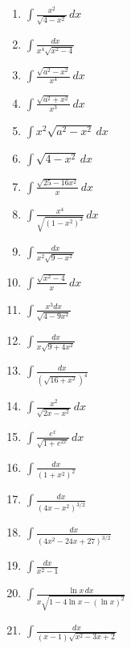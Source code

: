 \documentclass{article}
\begin{document}
\begin{multicols}{2}
\begin{enumerate}
    \item $\displaystyle \int \frac{x^2}{\sqrt{4 - x^2}} \, dx$
    \item $\displaystyle \int \frac{dx}{x^4 \sqrt{x^2 - 4}}$
    \item $\displaystyle \int \frac{\sqrt{a^2 - x^2}}{x^4} \, dx$
    \item $\displaystyle \int \frac{\sqrt{a^2 + x^2}}{x^3} \, dx$
    \item $\displaystyle \int x^2 \sqrt{a^2 - x^2} \, dx$
    \item $\displaystyle \int \sqrt{4 - x^2} \, dx$
    \item $\displaystyle \int \frac{\sqrt{25 - 16x^2}}{x} \, dx$
    \item $\displaystyle \int \frac{x^4}{\sqrt{(1 - x^2)^3}} \, dx$
    \item $\displaystyle \int \frac{dx}{x^2 \sqrt{9 - x^2}}$
    \item $\displaystyle \int \frac{\sqrt{x^2 - 4}}{x} \, dx$
    \item $\displaystyle \int \frac{x^3 dx}{\sqrt{4 - 9x^2}}$
    \item $\displaystyle \int \frac{dx}{x \sqrt{9 + 4x^2}}$
    \item $\displaystyle \int \frac{dx}{(\sqrt{16 + x^2})^4}$
    \item $\displaystyle \int \frac{x^2}{\sqrt{2x - x^2}} \, dx$
    \item $\displaystyle \int \frac{e^x}{\sqrt{1 + e^{2x}}} \, dx$
    \item $\displaystyle \int \frac{dx}{(1 + x^2)^2}$
    \item $\displaystyle \int \frac{dx}{(4x - x^2)^{3/2}}$
    \item $\displaystyle \int \frac{dx}{(4x^2 - 24x + 27)^{3/2}}$
    \item $\displaystyle \int \frac{dx}{x^2 - 1}$
    \item $\displaystyle \int \frac{\ln x \, dx}{x \sqrt{1 - 4 \ln x - (\ln x)^2}}$
    \item $\displaystyle \int \frac{dx}{(x - 1) \sqrt{x^2 - 3x + 2}}$
\end{enumerate}
\newpage

\end{multicols}
\end{document}
